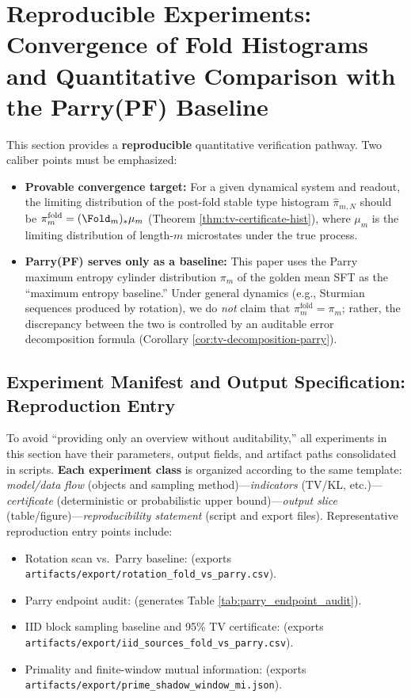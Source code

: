 \section{Reproducible Experiments: Convergence of Fold Histograms and Quantitative Comparison with the Parry(PF) Baseline}\label{sec:experiments}

This section provides a \textbf{reproducible} quantitative verification pathway. Two caliber points must be emphasized:
\begin{itemize}
  \item \textbf{Provable convergence target:} For a given dynamical system and readout, the limiting distribution of the post-fold stable type histogram $\hat{\pi}_{m,N}$ should be $\pi_m^{\mathrm{fold}}=(\Fold_m)_*\mu_m$ (Theorem \ref{thm:tv-certificate-hist}), where $\mu_m$ is the limiting distribution of length-$m$ microstates under the true process.
  \item \textbf{Parry(PF) serves only as a baseline:} This paper uses the Parry maximum entropy cylinder distribution $\pi_m$ of the golden mean SFT as the ``maximum entropy baseline.'' Under general dynamics (e.g., Sturmian sequences produced by rotation), we do \emph{not} claim that $\pi_m^{\mathrm{fold}}=\pi_m$; rather, the discrepancy between the two is controlled by an auditable error decomposition formula (Corollary \ref{cor:tv-decomposition-parry}).
\end{itemize}

\subsection{Experiment Manifest and Output Specification: Reproduction Entry}\label{subsec:experiments-manifest}
To avoid ``providing only an overview without auditability,'' all experiments in this section have their parameters, output fields, and artifact paths consolidated in scripts. \textbf{Each experiment class} is organized according to the same template: \emph{model/data flow} (objects and sampling method)---\emph{indicators} (TV/KL, etc.)---\emph{certificate} (deterministic or probabilistic upper bound)---\emph{output slice} (table/figure)---\emph{reproducibility statement} (script and export files).
Representative reproduction entry points include:
\begin{itemize}
  \item Rotation scan vs.\ Parry baseline:  (exports \texttt{artifacts/export/rotation\_fold\_vs\_parry.csv}).
  \item Parry endpoint audit:  (generates Table \ref{tab:parry_endpoint_audit}).
  \item IID block sampling baseline and 95\% TV certificate:  (exports \texttt{artifacts/export/iid\_sources\_fold\_vs\_parry.csv}).
  \item Primality and finite-window mutual information:  (exports \texttt{artifacts/export/prime\_shadow\_window\_mi.json}).
\end{itemize}

